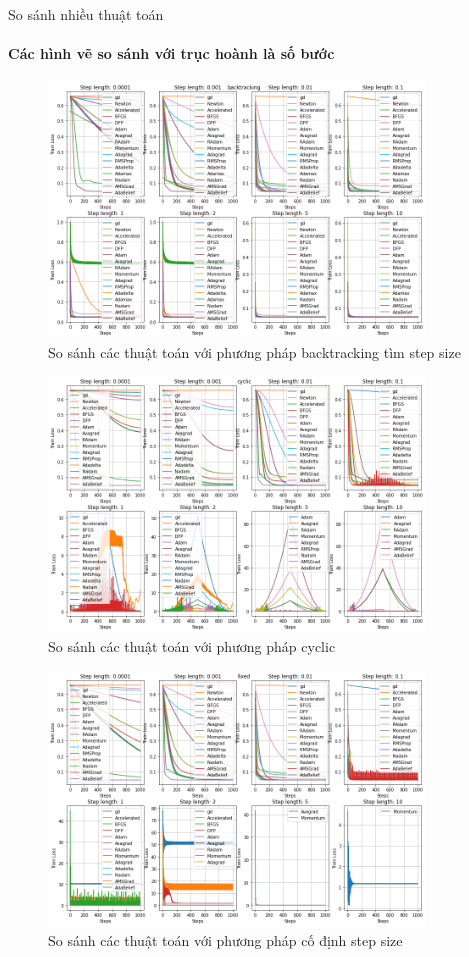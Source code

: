 \documentclass[10pt]{beamer}
\theoremstyle{remark}
\theoremstyle{definition}
\begin{document}
\begin{frame}[allowframebreaks]{So sánh nhiều thuật toán}
	\framesubtitle{Các hình vẽ so sánh với trục hoành là số bước}
	\begin{figure}
		\centering
		\includegraphics[width=10cm]{Thanh/backtrack-lr-step-op_step.png}
		\caption{So sánh các thuật toán với phương pháp backtracking tìm step size}
	\end{figure}

	\begin{figure}
		\centering
		\includegraphics[width=10cm]{Thanh/cyclic-lr-step-op_step.png}
		\caption{So sánh các thuật toán với phương pháp cyclic}
	\end{figure}

	\begin{figure}
		\centering
		\includegraphics[width=10cm]{Thanh/fixed-lr-step-op_step.png}
		\caption{So sánh các thuật toán với phương pháp cố định step size}
	\end{figure}


\end{frame}
\end{document}
